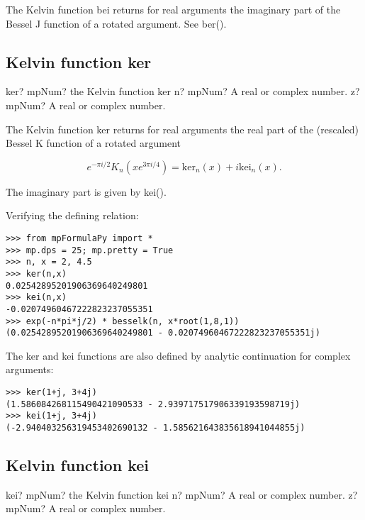\vpara
The Kelvin function bei returns for real arguments the imaginary part of the Bessel J function of a rotated argument. See ber().


\subsection{Kelvin function ker}

\begin{mpFunctionsExtract}
	\mpFunctionTwo
	{ker? mpNum? the Kelvin function ker}
	{n? mpNum? A real or complex number.}
	{z? mpNum? A real or complex number.}	
\end{mpFunctionsExtract}

\vpara
The Kelvin function ker returns for real arguments the real part of the (rescaled) Bessel K function of a rotated argument


\begin{equation}
e^{-\pi i/2}  K_n(x e^{3\pi i/4}) = \text{ker}_n(x) + i \text{kei}_n(x).
\end{equation}

The imaginary part is given by kei().

Verifying the defining relation:

\begin{lstlisting}
>>> from mpFormulaPy import *
>>> mp.dps = 25; mp.pretty = True
>>> n, x = 2, 4.5
>>> ker(n,x)
0.02542895201906369640249801
>>> kei(n,x)
-0.02074960467222823237055351
>>> exp(-n*pi*j/2) * besselk(n, x*root(1,8,1))
(0.02542895201906369640249801 - 0.02074960467222823237055351j)
\end{lstlisting}



The ker and kei functions are also defined by analytic continuation for complex arguments:

\begin{lstlisting}
>>> ker(1+j, 3+4j)
(1.586084268115490421090533 - 2.939717517906339193598719j)
>>> kei(1+j, 3+4j)
(-2.940403256319453402690132 - 1.585621643835618941044855j)
\end{lstlisting}



\subsection{Kelvin function kei}

\begin{mpFunctionsExtract}
	\mpFunctionTwo
	{kei? mpNum? the Kelvin function kei}
	{n? mpNum? A real or complex number.}
	{z? mpNum? A real or complex number.}	
\end{mpFunctionsExtract}

